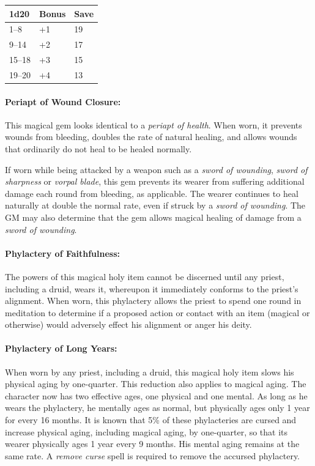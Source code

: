 \begin{multicols}{2}
\noindent
\begin{tabular}{|p{}|p{}|p{}|}
\hline
1d20	& Bonus	& Save \\
\hline\hline
\rowcolor[gray]{.9}1--8	& +1	& 19 \\
9--14	& +2	& 17 \\
\rowcolor[gray]{.9}15--18	& +3	& 15 \\
19--20	& +4	& 13 \\
\hline
\end{tabular}

\paragraph{Periapt of Wound Closure:} This magical gem looks identical to a \textit{periapt of health}.  When worn, it prevents wounds from bleeding, doubles the rate of natural healing, and allows wounds that ordinarily do not heal to be healed normally.

If worn while being attacked by a weapon such as a \textit{sword of wounding}, \textit{sword of sharpness} or \textit{vorpal blade}, this gem prevents its wearer from suffering additional damage each round from bleeding, as applicable.  The wearer continues to heal naturally at double the normal rate, even if struck by a \textit{sword of wounding}.  The GM may also determine that the gem allows magical healing of damage from a \textit{sword of wounding}.

\paragraph{Phylactery of Faithfulness:} The powers of this magical holy item cannot be discerned until any priest, including a druid, wears it, whereupon it immediately conforms to the priest's alignment.  When worn, this phylactery allows the priest to spend one round in meditation to determine if a proposed action or contact with an item (magical or otherwise) would adversely effect his alignment or anger his deity.

\paragraph{Phylactery of Long Years:} When worn by any priest, including a druid, this magical holy item slows his physical aging by one-quarter.  This reduction also applies to magical aging.  The character now has two effective ages, one physical and one mental.  As long as he wears the phylactery, he mentally ages as normal, but physically ages only 1 year for every 16 months.  It is known that 5\% of these phylacteries are cursed and increase physical aging, including magical aging, by one-quarter, so that its wearer physically ages 1 year every 9 months.  His mental aging remains at the same rate.  A \textit{remove curse} spell is required to remove the accursed phylactery.


\end{multicols}
